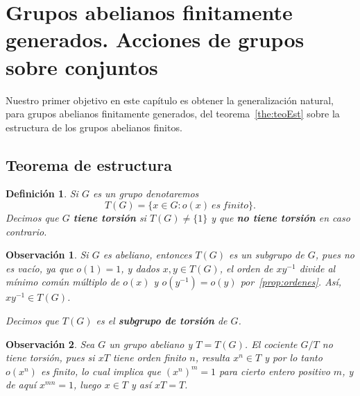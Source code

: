 \documentclass[12pt]{article}
\newtheorem{definition}[theorem]{Definición}
\newtheorem{observation}{Observación}[theorem]
\begin{document}
\section{Grupos abelianos finitamente generados. Acciones de grupos sobre conjuntos}

Nuestro primer objetivo en este capítulo es obtener la generalización natural, para grupos abelianos finitamente generados, del teorema~\ref{the:teoEst} sobre la estructura de los grupos abelianos finitos.

\subsection{Teorema de estructura}

\begin{definition}Si $G$ es un grupo denotaremos $$T(G) = \lbrace x \in G: o(x)~es~finito \rbrace.$$ Decimos que $G$ \textbf{tiene torsión} si $T(G) \neq \lbrace 1 \rbrace$ y que \textbf{no tiene torsión} en caso contrario.
\end{definition}

\begin{observation}Si $G$ es abeliano, entonces $T(G)$ es un subgrupo de $G$, pues no es vacío, ya que $o(1) = 1$, y dados $x,y \in T(G)$, el orden de $xy^{-1}$ divide al mínimo común múltiplo de $o(x)$ y $o(y^{-1}) = o(y)$ por~\ref{prop:ordenes}. Así, $xy^{-1} \in T(G)$. 

Decimos que $T(G)$ es el \textbf{subgrupo de torsión} de $G$.
\end{observation}

\begin{observation}Sea $G$ un grupo abeliano y $T = T(G)$. El cociente $G/T$ no tiene torsión, pues si $xT$ tiene orden finito $n$, resulta $x^n \in T$ y por lo tanto $o(x^n)$ es finito, lo cual implica que $(x^n)^m = 1$ para cierto entero positivo $m$, y de aquí $x^{mn}=1$, luego $x \in T$ y así $xT = T$.
\end{observation}
\end{document}
